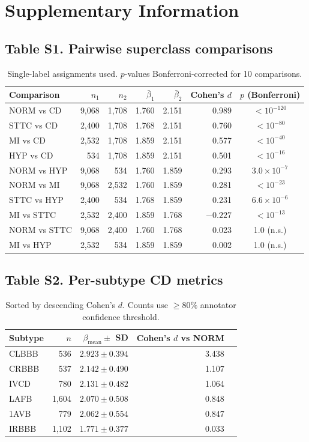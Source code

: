 \documentclass[11pt,a4paper]{article}
\begin{document}
\section*{Supplementary Information}

\subsection*{Table S1. Pairwise superclass comparisons}
\begin{table}[H]
\centering
\small
\begin{tabular}{lrrrrrc}
\toprule
Comparison & $n_1$ & $n_2$ & $\bar{\beta}_1$ & $\bar{\beta}_2$ & Cohen's $d$ & $p$ (Bonferroni) \\
\midrule
NORM vs CD   & 9,068 & 1,708 & 1.760 & 2.151 & 0.989 & $< 10^{-120}$ \\
STTC vs CD   & 2,400 & 1,708 & 1.768 & 2.151 & 0.760 & $< 10^{-80}$ \\
MI vs CD     & 2,532 & 1,708 & 1.859 & 2.151 & 0.577 & $< 10^{-40}$ \\
HYP vs CD    & 534   & 1,708 & 1.859 & 2.151 & 0.501 & $< 10^{-16}$ \\
NORM vs HYP  & 9,068 & 534   & 1.760 & 1.859 & 0.293 & $3.0 \times 10^{-7}$ \\
NORM vs MI   & 9,068 & 2,532 & 1.760 & 1.859 & 0.281 & $< 10^{-23}$ \\
STTC vs HYP  & 2,400 & 534   & 1.768 & 1.859 & 0.231 & $6.6 \times 10^{-6}$ \\
MI vs STTC   & 2,532 & 2,400 & 1.859 & 1.768 & $-0.227$ & $< 10^{-13}$ \\
NORM vs STTC & 9,068 & 2,400 & 1.760 & 1.768 & 0.023 & 1.0 (n.s.) \\
MI vs HYP    & 2,532 & 534   & 1.859 & 1.859 & 0.002 & 1.0 (n.s.) \\
\bottomrule
\end{tabular}
\caption*{Single-label assignments used. $p$-values Bonferroni-corrected for 10 comparisons.}
\end{table}

\subsection*{Table S2. Per-subtype CD metrics}
\begin{table}[H]
\centering
\begin{tabular}{lrrrc}
\toprule
Subtype & $n$ & $\beta_\text{mean} \pm$ SD & Cohen's $d$ vs NORM \\
\midrule
CLBBB & 536 & $2.923 \pm 0.394$ & 3.438 \\
CRBBB & 537 & $2.142 \pm 0.490$ & 1.107 \\
IVCD  & 780 & $2.131 \pm 0.482$ & 1.064 \\
LAFB  & 1,604 & $2.070 \pm 0.508$ & 0.848 \\
1AVB  & 779 & $2.062 \pm 0.554$ & 0.847 \\
IRBBB & 1,102 & $1.771 \pm 0.377$ & 0.033 \\
\bottomrule
\end{tabular}
\caption*{Sorted by descending Cohen's $d$. Counts use $\geq 80\%$ annotator confidence threshold.}
\end{table}
\end{document}
